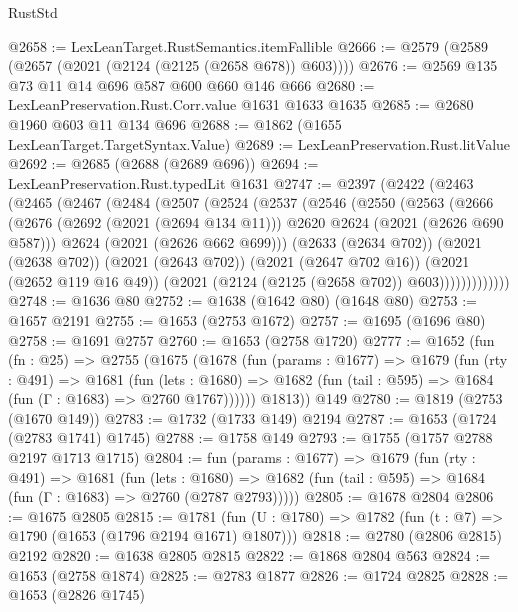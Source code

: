\begin{lexlean}{RustStd}
\begin{coremodule}
@2658 := LexLeanTarget.RustSemantics.itemFallible
@2666 := @2579 (@2589 (@2657 (@2021 (@2124 (@2125 (@2658 @678)) @603))))
@2676 := @2569 @135 @73 @11 @14 @696 @587 @600 @660 @146 @666
@2680 := LexLeanPreservation.Rust.Corr.value @1631 @1633 @1635
@2685 := @2680 @1960 @603 @11 @134 @696
@2688 := @1862 (@1655 LexLeanTarget.TargetSyntax.Value)
@2689 := LexLeanPreservation.Rust.litValue
@2692 := @2685 (@2688 (@2689 @696))
@2694 := LexLeanPreservation.Rust.typedLit @1631
@2747 := @2397
    (@2422
      (@2463
        (@2465
          (@2467
            (@2484
              (@2507
                (@2524
                  (@2537
                    (@2546
                      (@2550
                        (@2563
                          (@2666
                            (@2676
                              (@2692 (@2021 (@2694 @134 @11)))
                              @2620
                              @2624
                              (@2021 (@2626 @690 @587)))
                            @2624
                            (@2021 (@2626 @662 @699)))
                          (@2633 (@2634 @702))
                          (@2021 (@2638 @702))
                          (@2021 (@2643 @702))
                          (@2021 (@2647 @702 @16))
                          (@2021 (@2652 @119 @16 @49))
                          (@2021 (@2124 (@2125 (@2658 @702)) @603)))))))))))))
@2748 := @1636 @80
@2752 := @1638 (@1642 @80) (@1648 @80)
@2753 := @1657 @2191
@2755 := @1653 (@2753 @1672)
@2757 := @1695 (@1696 @80)
@2758 := @1691 @2757
@2760 := @1653 (@2758 @1720)
@2777 := @1652
    (fun (fn : @25) =>
    @2755
      (@1675
        (@1678
          (fun (params : @1677) =>
          @1679
            (fun (rty : @491) =>
            @1681
              (fun (lets : @1680) =>
              @1682 (fun (tail : @595) => @1684 (fun (Γ : @1683) => @2760 @1767))))))
        @1813))
    @149
@2780 := @1819 (@2753 (@1670 @149))
@2783 := @1732 (@1733 @149) @2194
@2787 := @1653 (@1724 (@2783 @1741) @1745)
@2788 := @1758 @149
@2793 := @1755 (@1757 @2788 @2197 @1713 @1715)
@2804 := fun (params : @1677) =>
  @1679
    (fun (rty : @491) =>
    @1681
      (fun (lets : @1680) =>
      @1682 (fun (tail : @595) => @1684 (fun (Γ : @1683) => @2760 (@2787 @2793)))))
@2805 := @1678 @2804
@2806 := @1675 @2805
@2815 := @1781 (fun (U : @1780) => @1782 (fun (t : @7) => @1790 (@1653 (@1796 @2194 @1671) @1807)))
@2818 := @2780 (@2806 @2815) @2192
@2820 := @1638 @2805 @2815
@2822 := @1868 @2804 @563
@2824 := @1653 (@2758 @1874)
@2825 := @2783 @1877
@2826 := @1724 @2825
@2828 := @1653 (@2826 @1745)

\end{coremodule}
\end{lexlean}
